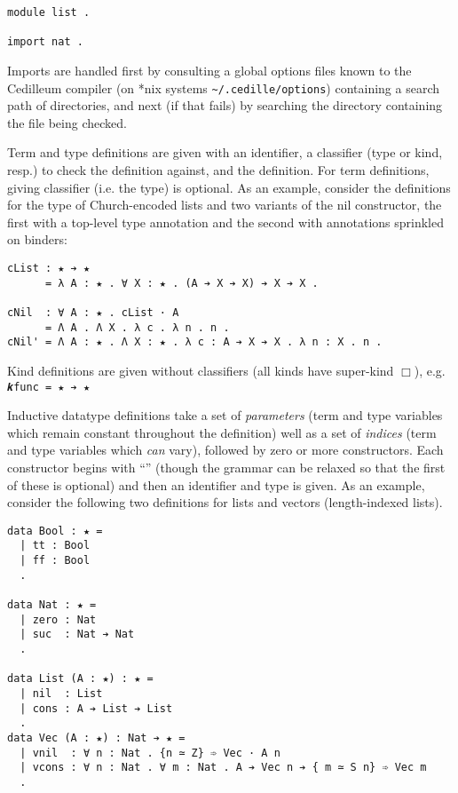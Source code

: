 \documentclass{article}
\begin{document}
\begin{verbatim}
module list .

import nat .
\end{verbatim}

\noindent Imports are handled first by consulting a global options files
known to the Cedilleum compiler (on *nix systems \verb|~/.cedille/options|)
containing a search path of directories, and next (if that fails) by searching
the directory containing the file being checked.

Term and type definitions are given with an identifier, a classifier (type or
kind, resp.) to check the definition against, and the definition. For term
definitions, giving classifier (i.e. the type) is optional. As an example,
consider the definitions for the type of Church-encoded lists and two variants
of the nil constructor, the first with a top-level type annotation and the
second with annotations sprinkled on binders:

\begin{verbatim}
cList : ★ ➔ ★
      = λ A : ★ . ∀ X : ★ . (A ➔ X ➔ X) ➔ X ➔ X .

cNil  : ∀ A : ★ . cList · A
      = Λ A . Λ X . λ c . λ n . n .
cNil' = Λ A : ★ . Λ X : ★ . λ c : A ➔ X ➔ X . λ n : X . n .
\end{verbatim}

Kind definitions are given without classifiers (all kinds have super-kind
$\Box$), e.g. \verb;𝒌func = ★ ➔ ★;

Inductive datatype definitions take a set of \textit{parameters} (term and type
variables which remain constant throughout the definition) well as a set of
\textit{indices} (term and type variables which \textit{can} vary), followed by
zero or more constructors. Each constructor begins with ``\textbf{\textbar}''
(though the grammar can be relaxed so that the first of these is optional) and
then an identifier and type is given. As an example, consider the following two
definitions for lists and vectors (length-indexed lists).

\begin{verbatim}
data Bool : ★ =
  | tt : Bool
  | ff : Bool
  .

data Nat : ★ =
  | zero : Nat
  | suc  : Nat ➔ Nat
  .

data List (A : ★) : ★ =
  | nil  : List
  | cons : A ➔ List ➔ List
  .
data Vec (A : ★) : Nat ➔ ★ =
  | vnil  : ∀ n : Nat . {n ≃ Z} ➾ Vec · A n
  | vcons : ∀ n : Nat . ∀ m : Nat . A ➔ Vec n ➔ { m ≃ S n} ➾ Vec m
  .
\end{verbatim}
\end{document}

